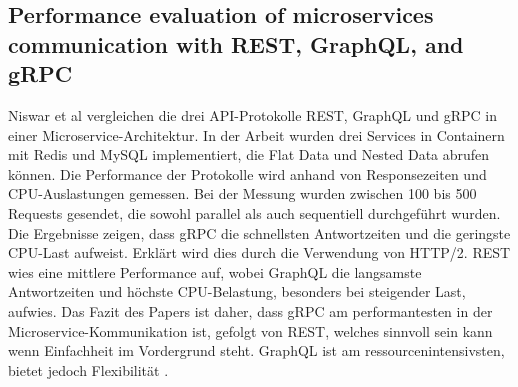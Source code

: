 \subsection{Performance evaluation of microservices communication with REST, GraphQL, and gRPC}
Niswar et al vergleichen die drei API-Protokolle REST, GraphQL und gRPC in einer Microservice-Architektur. In der Arbeit wurden drei Services in Containern mit Redis und MySQL implementiert, die Flat Data und Nested Data abrufen können. Die Performance der Protokolle wird anhand von Responsezeiten und CPU-Auslastungen gemessen. Bei der Messung wurden zwischen 100 bis 500 Requests gesendet, die sowohl parallel als auch sequentiell durchgeführt wurden.
Die Ergebnisse zeigen, dass gRPC die schnellsten Antwortzeiten und die geringste CPU-Last aufweist. Erklärt wird dies durch die Verwendung von HTTP/2.
REST wies eine mittlere Performance auf, wobei GraphQL die langsamste Antwortzeiten und höchste CPU-Belastung, besonders bei steigender Last, aufwies. Das Fazit des Papers ist daher, dass gRPC am performantesten in der Microservice-Kommunikation ist, gefolgt von REST, welches sinnvoll sein kann wenn Einfachheit im Vordergrund steht. GraphQL ist am ressourcenintensivsten, bietet jedoch Flexibilität \parencite{Niswar2024PerformanceEvaluation}.

\chapterend